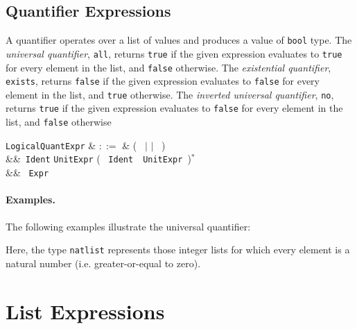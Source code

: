 
\subsection{Quantifier Expressions}
\label{c_expr_quantifier}

A quantifier operates over a list of values and produces a value of \lstinline{bool} type.  The {\em universal quantifier}, \lstinline{all}, returns \lstinline{true} if the given expression evaluates to \lstinline{true} for every element in the list, and \lstinline{false} otherwise.  The {\em existential quantifier}, \lstinline{exists}, returns \lstinline{false} if the given expression evaluates to \lstinline{false} for every element in the list, and \lstinline{true} otherwise.  The {\em inverted universal quantifier}, \lstinline{no}, returns \lstinline{true} if the given expression evaluates to \lstinline{false} for every element in the list, and \lstinline{false} otherwise

\begin{syntax}
\verb+LogicalQuantExpr+ & $::=$ & \big(\  $|$  $|$
\ \big)\ \token{\{}\\
&&\ \verb+Ident+  \verb+UnitExpr+ \big( \token{,}\ \verb+Ident+\
\ \verb+UnitExpr+\ \big)$^*$\\
&&  \token{|}\ \verb+Expr+\ \token{\}}\\
\end{syntax}

\paragraph{Examples.}  The following examples illustrate the universal quantifier:



Here, the type \lstinline{natlist} represents those integer lists for which every element is a natural number (i.e. greater-or-equal to zero).


\section{List Expressions}
\label{c_expr_list}

